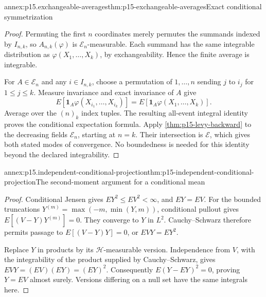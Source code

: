 \begin{annexitem}{annex:p15.exchangeable-averages}{thm:p15-exchangeable-averages}{Exact conditional symmetrization}
\begin{proof}
Permuting the first \(n\) coordinates merely permutes the summands
indexed by \(I_{n,k}\), so \(A_{n,k}(\varphi)\) is
\(\mathcal E_n\)-measurable. Each summand has the same integrable
distribution as \(\varphi(X_1,\ldots,X_k)\), by exchangeability.
Hence the finite average is integrable.

For \(A\in\mathcal E_n\) and any \(i\in I_{n,k}\), choose a
permutation of \(1,\ldots,n\) sending \(j\) to \(i_j\) for
\(1\leq j\leq k\). Measure invariance and exact invariance of \(A\)
give
\[
 E[\mathbf1_A\varphi(X_{i_1},\ldots,X_{i_k})]
                    =E[\mathbf1_A\varphi(X_1,\ldots,X_k)].
\]
Average over the \((n)_k\) index tuples.
The resulting all-event integral identity proves the conditional
expectation formula. Apply \cref{thm:p15-levy-backward} to the
decreasing fields \(\mathcal E_n\), starting at \(n=k\).
Their intersection is \(\mathcal E\), which gives both stated modes
of convergence. No boundedness is needed for this identity beyond
the declared integrability.
\end{proof}
\end{annexitem}

\begin{annexitem}{annex:p15.independent-conditional-projection}{thm:p15-independent-conditional-projection}{The second-moment argument for a conditional mean}
\begin{proof}
Conditional Jensen gives \(EY^2\leq EV^2<\infty\), and \(EY=EV\).
For the bounded truncations \(Y^{(m)}=\max(-m,\min(Y,m))\),
conditional pullout gives
\(E[(V-Y)Y^{(m)}]=0\).
They converge to \(Y\) in \(L^2\).
Cauchy--Schwarz therefore permits passage to
\(E[(V-Y)Y]=0\), or \(EVY=EY^2\).

Replace \(Y\) in products by its \(\mathcal H\)-measurable version.
Independence from \(V\), with the integrability of the product supplied
by Cauchy--Schwarz, gives
\(EVY=(EV)(EY)=(EY)^2\).
Consequently \(E(Y-EY)^2=0\), proving \(Y=EV\) almost surely.
Versions differing on a null set have the same integrals here.
\end{proof}
\end{annexitem}

